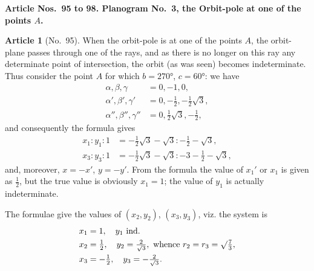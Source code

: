 \documentclass[11pt,a4paper]{article}
\theoremstyle{definition}
\newtheorem{art}{Article}
\begin{document}
\newpage
\noindent\textbf{Article Nos.~95 to 98. Planogram No.~3, the Orbit-pole at one of the points $A$.}

\begin{art}[No.~95]
When the orbit-pole is at one of the points $A$, the orbit-plane passes through one of the rays, and as there is no longer on this ray any determinate point of intersection, the orbit (as was seen) becomes indeterminate. Thus consider the point $A$ for which $b = 270°$, $c = 60°$: we have
\begin{align*}
\alpha, \beta, \gamma &= 0, -1, 0,\\
\alpha', \beta', \gamma' &= 0, -\tfrac{1}{2}, -\tfrac{1}{2}\surd 3,\\
\alpha'', \beta'', \gamma'' &= 0, \tfrac{1}{2}\surd 3, -\tfrac{1}{2},
\end{align*}
and consequently the formula gives
\begin{align*}
x_1 : y_1 : 1 &= -\tfrac{1}{2}\surd 3 - \surd 3 : -\tfrac{1}{2} - \surd 3,\\
x_3 : y_3 : 1 &= -\tfrac{1}{2}\surd 3 - \surd 3 : -3 - \tfrac{1}{2} - \surd 3,
\end{align*}
and, moreover, $x = -x'$, $y = -y'$. From the formula the value of $x_1'$ or $x_1$ is given as $\frac{1}{2}$, but the true value is obviously $x_1 = 1$; the value of $y_1$ is actually indeterminate.

The formulae give the values of $(x_2, y_2)$, $(x_3, y_3)$, viz. the system is
\begin{align*}
x_1 &= 1, \quad y_1 \text{ ind.}\\
x_2 &= \tfrac{1}{2}, \quad y_2 = \tfrac{2}{\surd 3}, \text{ whence } r_2 = r_3 = \surd\tfrac{7}{3},\\
x_3 &= -\tfrac{1}{2}, \quad y_3 = -\tfrac{2}{\surd 3}.
\end{align*}
\end{art}
\end{document}
